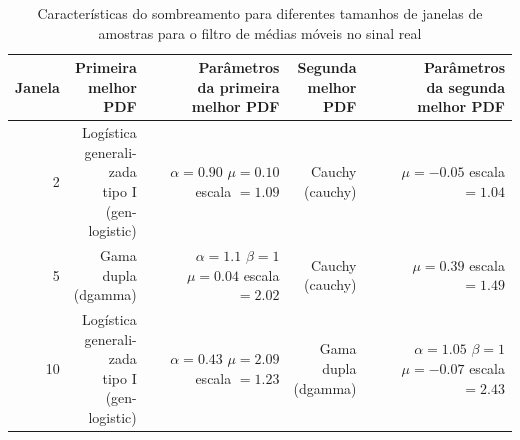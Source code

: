 \documentclass[journal,11pt,twocolumn]{IEEEtran}
\begin{document}
\begin{table}[h!]
    \centering
    \begin{tabular}{r|r|r|r|r}
        Janela & \makecell[r]{Primeira\\ melhor\\PDF} & \makecell[r]{Parâmetros\\da primeira\\melhor PDF} & \makecell[r]{Segunda\\ melhor\\PDF} & \makecell[r]{Parâmetros\\da segunda\\melhor PDF} \\
        \hline
        2  & \makecell[r]{Logística\\generali-\\zada\\tipo I\\(gen-\\logistic)} & \makecell[r]{$\alpha=0.90$\\$\mu=0.10$\\escala $=1.09$} & \makecell[r]{Cauchy\\(cauchy)} & \makecell[r]{$\mu=-0.05$\\escala $=1.04$} \\
        5  & \makecell[r]{Gama\\dupla\\(dgamma)} & \makecell[r]{$\alpha=1.1$\\$\beta=1$\\$\mu=0.04$\\escala $=2.02$} & \makecell[r]{Cauchy\\(cauchy)} & \makecell[r]{$\mu=0.39$\\escala $=1.49$}\\
        10 & \makecell[r]{Logística\\generali-\\zada\\tipo I\\(gen-\\logistic)} & \makecell[r]{$\alpha=0.43$\\$\mu=2.09$\\escala $=1.23$} & \makecell[r]{Gama\\dupla\\(dgamma)} & \makecell[r]{$\alpha=1.05$\\$\beta=1$\\$\mu=-0.07$\\escala $=2.43$}\\
    \end{tabular}
    \caption{Características do sombreamento para diferentes tamanhos de janelas de amostras para o filtro de médias móveis no sinal real}
    \label{tab:real-small-scale-fading}
\end{table}
\end{document}
